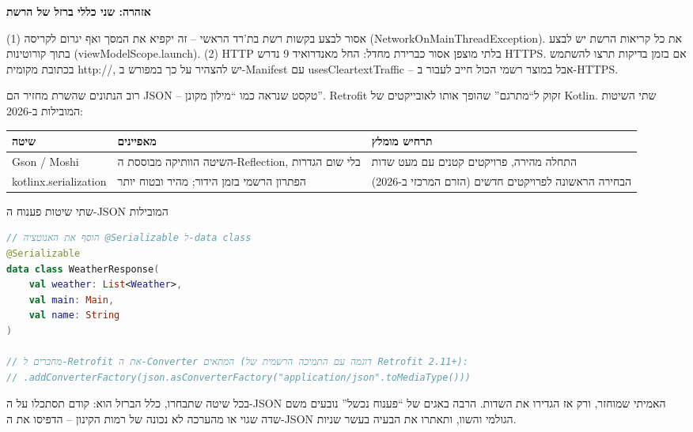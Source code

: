 \textbf{אזהרה: שני כללי ברזל של הרשת}\par

(1) אסור לבצע בקשות רשת בת'רד הראשי – זה יקפיא את המסך ואף יגרום לקריסה (NetworkOnMainThreadException). את כל קריאות הרשת יש לבצע בתוך קורוטינות (viewModelScope.launch). (2) HTTP בלתי מוצפן אסור כברירת מחדל: החל מאנדרואיד 9 נדרש HTTPS. אם בזמן בדיקות תרצו להשתמש בכתובת מקומית http://, יש להצהיר על כך במפורש ב-Manifest עם usesCleartextTraffic – אבל במוצר רשמי הכול חייב לעבור ב-HTTPS.


רוב הנתונים שהשרת מחזיר הם JSON – טקסט שנראה כמו “מילון מקונן”. Retrofit זקוק ל“מתרגם” שהופך אותו לאובייקטים של Kotlin. שתי השיטות המובילות ב-2026:

\begin{center}
\begin{tabularx}{\linewidth}{|X|X|X|}
\hline
\textbf{שיטה} & \textbf{מאפיינים} & \textbf{תרחיש מומלץ} \tabularnewline
\hline
Gson / Moshi & השיטה הוותיקה מבוססת ה-Reflection, בלי שום הגדרות & התחלה מהירה, פרויקטים קטנים עם מעט שדות \tabularnewline
kotlinx.serialization & הפתרון הרשמי בזמן הידור; מהיר ובטוח יותר & הבחירה הראשונה לפרויקטים חדשים (הזרם המרכזי ב-2026) \tabularnewline
\hline
\end{tabularx}
\end{center}

\begin{center}\small\color{gray}שתי שיטות פענוח ה-JSON המובילות\end{center}

\begin{lstlisting}[language=Kotlin]
// הוסף את האנוטציה @Serializable ל-data class
@Serializable
data class WeatherResponse(
    val weather: List<Weather>,
    val main: Main,
    val name: String
)

// מחברים ל-Retrofit את ה-Converter המתאים (דוגמה עם התמיכה הרשמית של Retrofit 2.11+):
// .addConverterFactory(json.asConverterFactory("application/json".toMediaType()))
\end{lstlisting}

בכל שיטה שתבחרו, כלל הברזל הוא: קודם תסתכלו על ה-JSON האמיתי שמוחזר, ורק אז הגדירו את השדות. הרבה באגים של “פענוח נכשל” נובעים משם שדה שגוי או מהערכה לא נכונה של רמות הקינון – הדפיסו את ה-JSON הגולמי והשוו, ותאתרו את הבעיה בעשר שניות.



